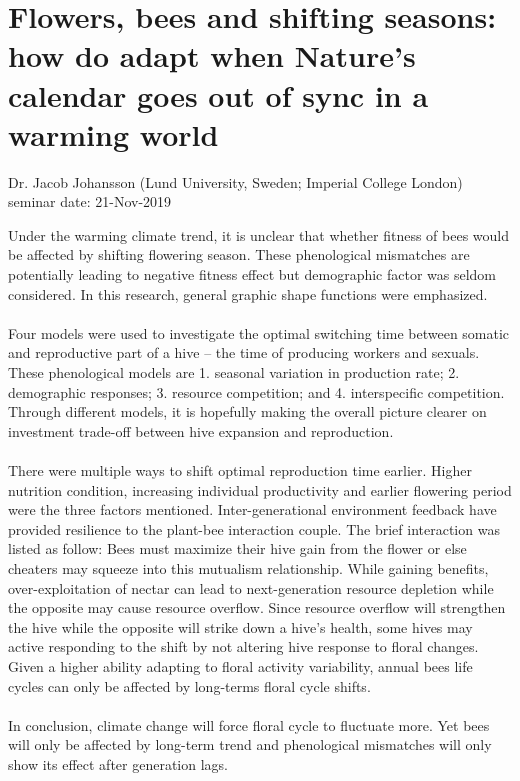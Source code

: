 \documentclass{article}
\begin{document}
    \section{Flowers, bees and shifting seasons: how do adapt when Nature's calendar goes out of sync in a warming world}
    \begin{flushright}
        \large{Dr. Jacob Johansson (Lund University, Sweden; Imperial College London)}\\
        seminar date: 21-Nov-2019
    \end{flushright}
    Under the warming climate trend, it is unclear that whether fitness of bees would be affected by shifting flowering season.  These phenological mismatches are potentially leading to negative fitness effect but demographic factor was seldom considered.  In this research, general graphic shape functions were emphasized.\\\\
    Four models were used to investigate the optimal switching time between somatic and reproductive part of a hive -- the time of producing workers and sexuals.  These phenological models are 1. seasonal variation in production rate; 2. demographic responses; 3. resource competition; and 4. interspecific competition.  Through different models, it is hopefully making the overall picture clearer on investment trade-off between hive expansion and reproduction.\\\\
    There were multiple ways to shift optimal reproduction time earlier.  Higher nutrition condition, increasing individual productivity and earlier flowering period were the three factors mentioned.  Inter-generational environment feedback have provided resilience to the plant-bee interaction couple.  The brief interaction was listed as follow:  Bees must maximize their hive gain from the flower or else cheaters may squeeze into this mutualism relationship.  While gaining benefits, over-exploitation of nectar can lead to next-generation resource depletion while the opposite may cause resource overflow.  Since resource overflow will strengthen the hive while the opposite will strike down a hive's health, some hives may active responding to the shift by not altering hive response to floral changes.  Given a higher ability adapting to floral activity variability, annual bees life cycles can only be affected by long-terms floral cycle shifts.\\\\
    In conclusion, climate change will force floral cycle to fluctuate more.  Yet bees will only be affected by long-term trend and phenological mismatches will only show its effect after generation lags.
    \clearpage
    
\end{document}

